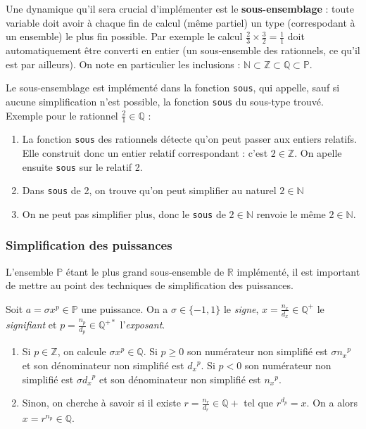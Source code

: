 \documentclass[french]{article}
\newcommand{\p}{\texttt} %
\begin{document}
Une dynamique qu'il sera crucial d'implémenter est le \textbf{sous-ensemblage} : toute variable doit avoir à chaque fin de calcul (même partiel) un type (correspodant à un ensemble) le plus fin possible. Par exemple le calcul $\frac{2}{3} \times \frac{3}{2} = \frac{1}{1}$ doit automatiquement être converti en entier (un sous-ensemble des rationnels, ce qu'il est par ailleurs). On note en particulier les inclusions : $\mathbb{N} \subset \mathbb{Z} \subset \mathbb{Q} \subset \mathbb{P}$.

Le sous-ensemblage est implémenté dans la fonction \p{sous}, qui appelle, sauf si aucune simplification n'est possible, la fonction \p{sous} du sous-type trouvé.
Exemple pour le rationnel $\frac{2}{1} \in \mathbb{Q}$ :
\begin{enumerate}
  \item La fonction \p{sous} des rationnels détecte qu'on peut passer aux entiers relatifs. Elle construit donc un entier relatif correspondant : c'est $2 \in \mathbb{Z}$. On apelle ensuite \p{sous} sur le relatif 2.
  \item Dans \p{sous} de 2, on trouve qu'on peut simplifier au naturel $2 \in \mathbb{N}$
  \item On ne peut pas simplifier plus, donc le \p{sous} de $2 \in \mathbb{N}$ renvoie le même $2 \in \mathbb{N}$.
\end{enumerate}

\subsubsection{Simplification des puissances}

L'ensemble $\mathbb{P}$ étant le plus grand sous-ensemble de $\mathbb{R}$ implémenté, il est important de mettre au point des techniques de simplification des puissances.

Soit $a = \sigma x ^ p \in \mathbb{P}$ une puissance. On a $\sigma \in \{-1, 1\}$ le \textit{signe}, $x = \frac{n_x}{d_x} \in \mathbb{Q}^+$ le \textit{signifiant} et $p = \frac{n_p}{d_p} \in \mathbb{Q}^{+*}$ l'\textit{exposant}.

\begin{enumerate}
  \item Si $p \in \mathbb{Z}$, on calcule $\sigma x ^ p \in \mathbb{Q}$. Si $p \ge 0$ son numérateur non simplifié est $\sigma {n_x}^p$ et son dénominateur non simplifié est ${d_x}^p$. Si $p < 0$ son numérateur non simplifié est $\sigma {d_x}^p$ et son dénominateur non simplifié est ${n_x}^p$.
  \item Sinon, on cherche à savoir si il existe $r = \frac{n_r}{d_r} \in \mathbb{Q}+$ tel que $r^{d_p} = x$. On a alors $x = r^{n_p} \in \mathbb{Q}$.
\end{enumerate}
\end{document}
